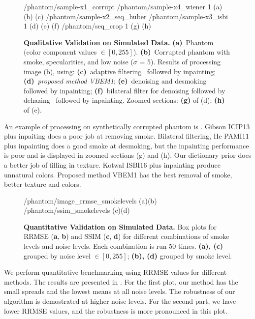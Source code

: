 \begin{figure}[!h]
     {/phantom/sample-x1_corrupt} {/phantom/sample-x4_wiener} {1} {(a)} {(b)} {(c)}
     {/phantom/sample-x2_seq_huber} {/phantom/sample-x3_isbi} {1} {(d)} {(e)} {(f)}
     {/phantom/seq_crop} {1} {(g)} {(h)}
    \vspace{-10pt}
    \caption
    {
        {\bf Qualitative Validation on Simulated Data. }
        {\bf (a)}~Phantom (color component values $\in [0,255]$).
        {\bf (b)}~Corrupted phantom with smoke, specularities, and low noise ($\sigma$ = 5).
        Results of processing image (b), using:
        {\bf (c)}~adaptive filtering~\cite{gibson2013wiener} followed by inpainting;
        {\bf (d)}~{\em proposed method VBEM1};
        {\bf (e)}~denoising and desmoking~\cite{kotwal2016joint} followed by inpainting;
        {\bf (f)}~bilateral filter for denoising followed by dehazing~\cite{he2011dark} followed by inpainting.
        Zoomed sections:
        {\bf (g)} of (d);
        {\bf (h)} of (e).
    }
    \label{fig:phantomImages}
\end{figure}
An example of processing on synthetically corrupted phantom is . Gibson ICIP13 \cite{gibson2013wiener} plus inpaiting does a poor job at removing smoke. Bilateral filtering, He PAMI11 \cite{he2011dark} plus inpainting does a good smoke at desmoking, but the inpainting performance is poor and is displayed in zoomed sections (g) and (h). Our dictionary prior does a better job of filling in texture. Kotwal ISBI16 plus inpainting produce unnatural colors. Proposed method VBEM1 has the best removal of smoke, better texture and colors.

\begin{figure}[!h]
     {/phantom/image_rrmse_smokelevels} {(a)}{(b)}
     {/phantom/ssim_smokelevels} {(c)}{(d)}
    \caption{
        {\bf Quantitative Validation on Simulated Data.}
        Box plots for RRMSE (\textbf{a}, \textbf{b}) and SSIM (\textbf{c}, \textbf{d}) for different combinations of smoke levels and noise levels. Each combination is run 50 times.
        {\bf (a), (c)} grouped by noise level $\in [0, 255]$;
        {\bf (b), (d)} grouped by smoke level.
    }
    \label{fig:phantomBoxplots}
\end{figure}
We perform quantitative benchmarking using RRMSE values for different methods. The results are presented in . For the first plot, our method has the small spreads and the lowest means at all noise levels. The robustness of our algorithm is demostrated at higher noise levels. For the second part, we have lower RRMSE values, and the robustness is more pronounced in this plot.


